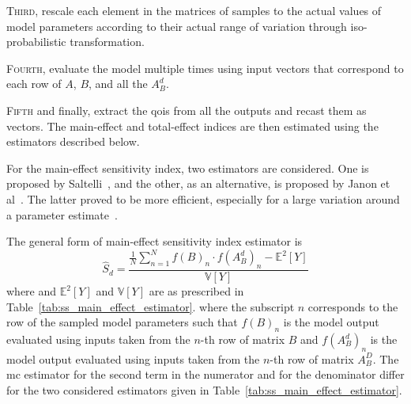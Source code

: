 \textsc{Third}, rescale each element in the matrices of samples to the actual values of model parameters according to their actual range of variation through iso-probabilistic transformation.

\textsc{Fourth}, evaluate the model multiple times using input vectors that correspond to each row of $A$, $B$, and all the $A_B^d$.

\textsc{Fifth} and finally, extract the \gls{qoi}s from all the outputs and recast them as vectors.
The main-effect and total-effect indices are then estimated using the estimators described below.

For the main-effect sensitivity index, two estimators are considered.
One is proposed by Saltelli~\cite{Saltelli2002}, and the other, as an alternative, is proposed by Janon et al~\cite{Janon2014}.
The latter proved to be more efficient, especially for a large variation around a parameter estimate~\cite{Iooss2015,Janon2014}.

The general form of main-effect sensitivity index estimator is
\begin{equation}
  \widehat{S}_d = \frac{\frac{1}{N}\sum_{n=1}^N f(B)_n \cdot f(A_B^d)_n - \mathbb{E}^2[Y]}{\mathbb{V}[Y]}
\label{eq:ss_main_effect_estimator}
\end{equation}
where and $\mathbb{E}^2[Y]$ and $\mathbb{V}[Y]$ are as prescribed in Table~\ref{tab:ss_main_effect_estimator}.
where the subscript $n$ corresponds to the row of the sampled model parameters 
such that $f(B)_n$ is the model output evaluated using inputs taken from the $n$-th row of matrix $B$ 
and $f(A_B^d)_n$ is the model output evaluated using inputs taken from the $n$-th row of matrix $A_B^D$.
The \gls{mc} estimator for the second term in the numerator and for the denominator differ for the two considered estimators given in Table~\ref{tab:ss_main_effect_estimator}.

